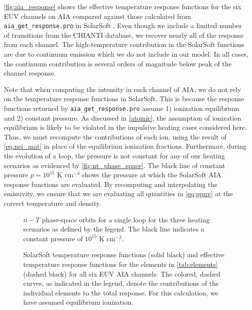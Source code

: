\autoref{fig:aia_response} shows the effective temperature response functions for the six EUV channels on AIA compared against those calculated from \texttt{aia\_get\_response.pro} in SolarSoft \citep{freeland_data_1998}. Even though we include a limited number of transitions from the CHIANTI database, we recover nearly all of the response from each channel. The high-temperature contribution in the SolarSoft functions are due to continuum emission which we do not include in our model. In all cases, the continuum contribution is several orders of magnitude below peak of the channel response.

Note that when computing the intensity in each channel of AIA, we do not rely on the temperature response functions in SolarSoft. This is because the response functions returned by \texttt{aia\_get\_response.pro} assume 1) ionization equilibrium and 2) constant pressure. As discussed in \autoref{atomic}, the assumption of ionization equilibrium is likely to be violated in the impulsive heating cases considered here. Thus, we must recompute the contributions of each ion, using the result of \autoref{eq:nei_mat} in place of the equilibrium ionization fractions. Furthermore, during the evolution of a loop, the pressure is not constant for any of our heating scenarios as evidenced by \autoref{fig:nt_phase_space}. The black line of constant pressure $p=10^{15}$ K cm$^{-3}$ shows the pressure at which the SolarSoft AIA response functions are evaluated. By recomputing and interpolating the emissivity, we ensure that we are evaluating all quantities in \autoref{eq:ppuv} at the correct temperature and density. 

\begin{figure}
    \caption{$n-T$ phase-space orbits for a single loop for the three heating scenarios as defined by the legend. The black line indicates a constant pressure of $10^{15}$ K cm$^{-3}$. }
    \label{fig:nt_phase_space}
\end{figure}

\begin{figure*}
    \caption{SolarSoft temperature response functions (solid black) and effective temperature response functions for the elements in \autoref{tab:elements} (dashed black) for all six EUV AIA channels. The colored, dashed curves, as indicated in the legend, denote the contributions of the individual elements to the total response. For this calculation, we have assumed equilibrium ionization. }
    \label{fig:aia_response}
\end{figure*}

